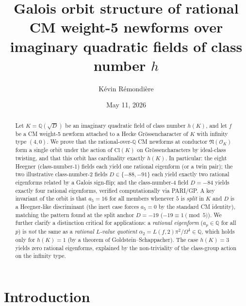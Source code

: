 \documentclass[12pt]{amsart}
\theoremstyle{definition}
\newcommand{\Q}{\mathbb{Q}}
\newcommand{\OK}{\mathcal{O}_K}
\newcommand{\ClK}{\mathrm{Cl}(K)}
\newcommand{\alphatwo}{\alpha_2}
\begin{document}
\title[Galois orbits of rational CM weight-5 newforms]{Galois orbit structure of rational CM weight-5 newforms
  over imaginary quadratic fields of class number $h$}

\author{K\'evin R\'emondi\`ere}
\address{Independent Researcher, Oloron-Sainte-Marie, France}

\date{May 11, 2026}

\begin{abstract}
Let $K = \Q(\sqrt{D})$ be an imaginary quadratic field of class number $h(K)$,
and let $f$ be a CM weight-5 newform attached to a Hecke Gr\"ossencharacter
of $K$ with infinity type $(4, 0)$.
We prove that the rational-over-$\Q$ CM newforms at conductor $\mathfrak{N}(\OK)$
form a single orbit under the action of $\ClK$ on Gr\"ossencharacters by
ideal-class twisting, and that this orbit has cardinality exactly $h(K)$.
In particular: the eight Heegner (class-number-1) fields each yield one
rational eigenform (or a twin pair); the two illustrative class-number-2 fields
$D \in \{-88, -91\}$ each yield exactly two rational eigenforms related by a
Galois sign-flip; and the class-number-4 field $D = -84$ yields exactly four
rational eigenforms, verified computationally via PARI/GP.
A key invariant of the orbit is that $a_5 = 16$ for all members
whenever $5$ is \emph{split} in $K$ and $D$ is a Heegner-like
discriminant (the inert case forces $a_5 = 0$ by the standard CM
identity), matching the pattern found at the split anchor $D = -19$
($-19 \equiv 1 \pmod 5$).
We further clarify a distinction critical for applications:
a \emph{rational eigenform} ($a_p \in \Q$ for all $p$) is
\emph{not} the same as a \emph{rational $L$-value quotient}
$\alphatwo = L(f, 2)\pi^2/\Omega^4 \in \Q$,
which holds only for $h(K) = 1$ (by a theorem of Goldstein--Schappacher).
The case $h(K) = 3$ yields zero rational eigenforms, explained by the
non-triviality of the class-group action on the infinity type.
\end{abstract}

\maketitle

\tableofcontents

\section{Introduction}
\end{document}
